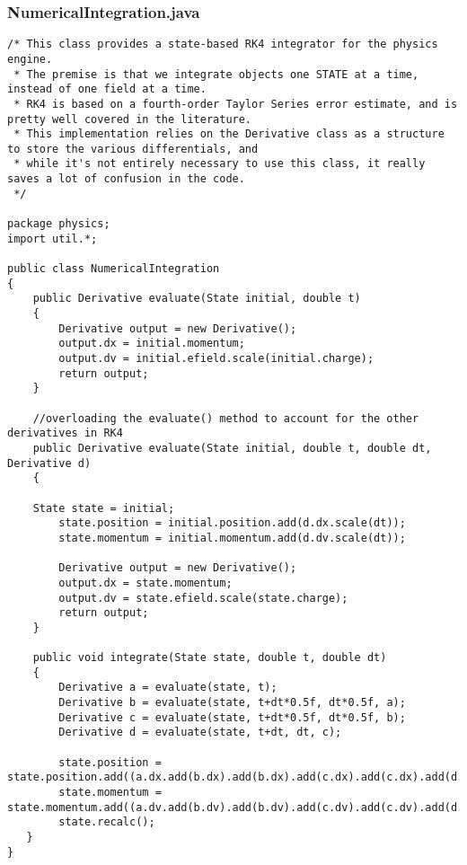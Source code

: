 \documentclass[10pt]{article}
\begin{document}
\subsubsection{NumericalIntegration.java}
\begin{verbatim}
/* This class provides a state-based RK4 integrator for the physics engine. 
 * The premise is that we integrate objects one STATE at a time, instead of one field at a time.
 * RK4 is based on a fourth-order Taylor Series error estimate, and is pretty well covered in the literature.
 * This implementation relies on the Derivative class as a structure to store the various differentials, and
 * while it's not entirely necessary to use this class, it really saves a lot of confusion in the code.
 */

package physics;
import util.*;

public class NumericalIntegration
{	
	public Derivative evaluate(State initial, double t)
	{
		Derivative output = new Derivative();
		output.dx = initial.momentum;
		output.dv = initial.efield.scale(initial.charge);
		return output;
	}
	
	//overloading the evaluate() method to account for the other derivatives in RK4	
	public Derivative evaluate(State initial, double t, double dt, Derivative d)
	{

	State state = initial;
	    state.position = initial.position.add(d.dx.scale(dt));
	    state.momentum = initial.momentum.add(d.dv.scale(dt)); 

	    Derivative output = new Derivative();
	    output.dx = state.momentum;
	    output.dv = state.efield.scale(state.charge);
	    return output;
	}
	
	public void integrate(State state, double t, double dt)
    {
        Derivative a = evaluate(state, t);      
        Derivative b = evaluate(state, t+dt*0.5f, dt*0.5f, a);
        Derivative c = evaluate(state, t+dt*0.5f, dt*0.5f, b);
        Derivative d = evaluate(state, t+dt, dt, c);

        state.position = state.position.add((a.dx.add(b.dx).add(b.dx).add(c.dx).add(c.dx).add(d.dx)).scale(dt/6));
        state.momentum = state.momentum.add((a.dv.add(b.dv).add(b.dv).add(c.dv).add(c.dv).add(d.dv)).scale(dt/6));
        state.recalc();    
   }
}
\end{verbatim}
\end{document}
